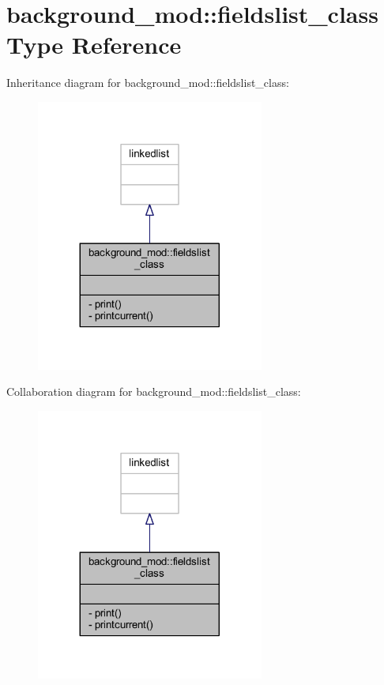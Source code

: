 \hypertarget{structbackground__mod_1_1fieldslist__class}{}\section{background\+\_\+mod\+:\+:fieldslist\+\_\+class Type Reference}
\label{structbackground__mod_1_1fieldslist__class}


Inheritance diagram for background\+\_\+mod\+:\+:fieldslist\+\_\+class\+:
\nopagebreak
\begin{figure}[H]
\begin{center}
\leavevmode
\includegraphics[width=212pt]{structbackground__mod_1_1fieldslist__class__inherit__graph}
\end{center}
\end{figure}


Collaboration diagram for background\+\_\+mod\+:\+:fieldslist\+\_\+class\+:
\nopagebreak
\begin{figure}[H]
\begin{center}
\leavevmode
\includegraphics[width=212pt]{structbackground__mod_1_1fieldslist__class__coll__graph}
\end{center}
\end{figure}
